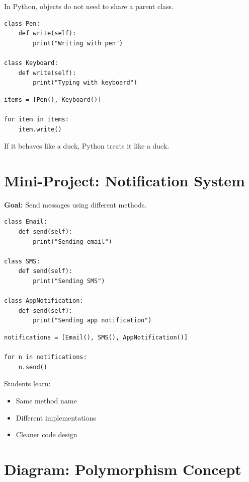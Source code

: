In Python, objects do not need to share a parent class.

\begin{verbatim}
class Pen:
    def write(self):
        print("Writing with pen")

class Keyboard:
    def write(self):
        print("Typing with keyboard")
\end{verbatim}

\begin{verbatim}
items = [Pen(), Keyboard()]

for item in items:
    item.write()
\end{verbatim}

If it behaves like a duck, Python treats it like a duck.

\section{Mini-Project: Notification System}

\textbf{Goal:} Send messages using different methods.

\begin{verbatim}
class Email:
    def send(self):
        print("Sending email")

class SMS:
    def send(self):
        print("Sending SMS")

class AppNotification:
    def send(self):
        print("Sending app notification")
\end{verbatim}

\begin{verbatim}
notifications = [Email(), SMS(), AppNotification()]

for n in notifications:
    n.send()
\end{verbatim}

Students learn:
\begin{itemize}
    \item Same method name
    \item Different implementations
    \item Cleaner code design
\end{itemize}

\section{Diagram: Polymorphism Concept}

\begin{center}
\end{center}

